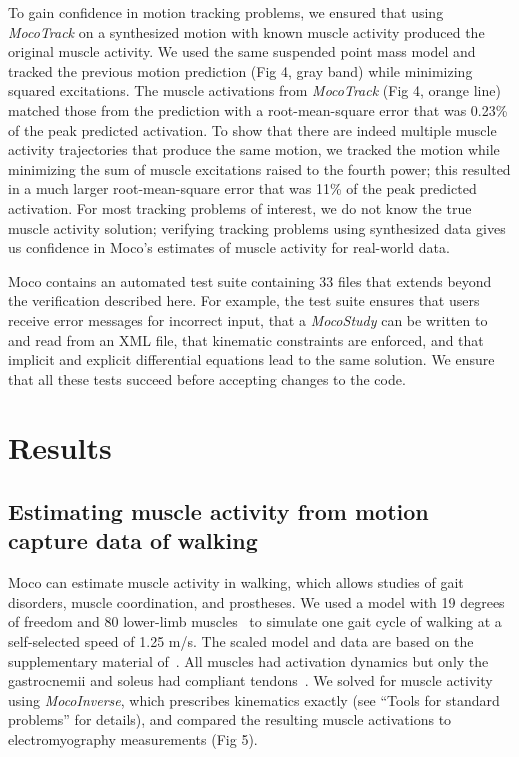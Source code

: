 \documentclass[10pt,letterpaper]{article}
\begin{document}
To gain confidence in motion tracking problems, we ensured that using \textit{MocoTrack} on a synthesized motion with known muscle activity produced the original muscle activity. We used the same suspended point mass model and tracked the previous motion prediction (Fig 4, gray band) while minimizing squared excitations. The muscle activations from \textit{MocoTrack} (Fig 4, orange line) matched those from the prediction with a root-mean-square error that was 0.23\% of the peak predicted activation. To show that there are indeed multiple muscle activity trajectories that produce the same motion, we tracked the motion while minimizing the sum of muscle excitations raised to the fourth power; this resulted in a much larger root-mean-square error that was 11\% of the peak predicted activation. For most tracking problems of interest, we do not know the true muscle activity solution; verifying tracking problems using synthesized data gives us confidence in Moco’s estimates of muscle activity for real-world data.

Moco contains an automated test suite containing 33 files that extends beyond the verification described here. For example, the test suite ensures that users receive error messages for incorrect input, that a \textit{MocoStudy} can be written to and read from an XML file, that kinematic constraints are enforced, and that implicit and explicit differential equations lead to the same solution. We ensure that all these tests succeed before accepting changes to the code.

\section*{Results}

\subsection*{Estimating muscle activity from motion capture data of walking}

Moco can estimate muscle activity in walking, which allows studies of gait disorders, muscle coordination, and prostheses. We used a model with 19 degrees of freedom and 80 lower-limb muscles~\cite{Rajagopal:2016ek} to simulate one gait cycle of walking at a self-selected speed of 1.25 m/s. The scaled model and data are based on the supplementary material of~\cite{Rajagopal:2016ek}. All muscles had activation dynamics but only the gastrocnemii and soleus had compliant tendons~\cite{Groote:2016dq}. We solved for muscle activity using \textit{MocoInverse}, which prescribes kinematics exactly (see “Tools for standard problems” for details), and compared the resulting muscle activations to electromyography measurements (Fig 5).
\end{document}

